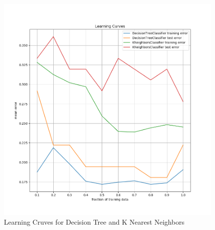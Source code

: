 \documentclass[11pt]{article}
\begin{document}
\begin{itemize}
\begin{enumerate}
        \begin{figure}
          \includegraphics[width=\textwidth]{figs/all_learning_curve.png}
          \caption{Learning Cruves for Decision Tree and K Nearest Neighbors}
          \label{fig:learning_curve}
        \end{figure}
    \end{enumerate}
\end{itemize}
\end{document}
